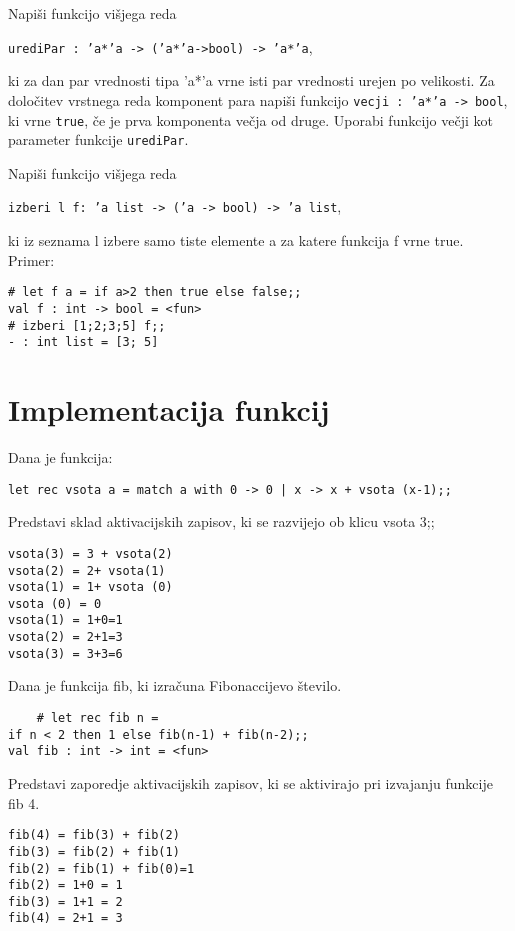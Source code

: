 \begin{ex}
Napi\v si funkcijo vi\v sjega reda 
\begin{center}
\texttt{urediPar : 'a*'a -> ('a*'a->bool) -> 'a*'a}, 
\end{center}
ki za dan par vrednosti tipa 'a*'a vrne isti par vrednosti urejen po velikosti. Za dolo\v citev vrstnega reda komponent para napi\v si funkcijo 
\texttt{vecji : 'a*'a -> bool}, 
ki vrne \texttt{true}, \v ce je prva komponenta ve\v cja od druge. Uporabi funkcijo ve\v cji kot parameter funkcije \texttt{urediPar}.

\end{ex}
\begin{ex}
Napi\v si funkcijo vi\v sjega reda 
\begin{center}
\texttt{izberi l f: 'a list -> ('a -> bool) -> 'a list},
\end{center}
ki iz seznama l izbere samo
tiste elemente a za katere funkcija f vrne true.
Primer: 
\begin{verbatim}
# let f a = if a>2 then true else false;;
val f : int -> bool = <fun>
# izberi [1;2;3;5] f;;
- : int list = [3; 5]
\end{verbatim}

\section{Implementacija funkcij}

\end{ex}
\begin{ex}
Dana je funkcija:
\begin{verbatim}
let rec vsota a = match a with 0 -> 0 | x -> x + vsota (x-1);;
\end{verbatim}

Predstavi sklad aktivacijskih zapisov, ki se razvijejo ob klicu vsota 3;;

\begin{sol}
\begin{verbatim}
vsota(3) = 3 + vsota(2)
vsota(2) = 2+ vsota(1)
vsota(1) = 1+ vsota (0)
vsota (0) = 0
vsota(1) = 1+0=1
vsota(2) = 2+1=3
vsota(3) = 3+3=6
\end{verbatim}
\end{sol}

\end{ex}
\begin{ex}
Dana je funkcija fib, ki izra\v cuna Fibonaccijevo \v stevilo.

\begin{verbatim}
	# let rec fib n =
if n < 2 then 1 else fib(n-1) + fib(n-2);;
val fib : int -> int = <fun>
\end{verbatim}
Predstavi zaporedje aktivacijskih zapisov, ki se aktivirajo pri izvajanju funkcije fib 4.

\begin{sol}
\begin{verbatim}
fib(4) = fib(3) + fib(2)
fib(3) = fib(2) + fib(1)
fib(2) = fib(1) + fib(0)=1
fib(2) = 1+0 = 1
fib(3) = 1+1 = 2
fib(4) = 2+1 = 3
\end{verbatim}
\end{sol}

\end{ex}
